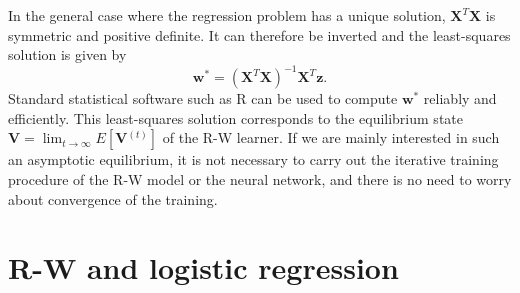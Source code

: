 \documentclass[conference]{IEEEtran}
\newcommand{\psup}[1]{\ensuremath{^{(#1)}}}
\newcommand{\psupt}{\psup{t}}
\begin{document}
In the general case where the regression problem has a unique solution, $\mathbf{X}^T \mathbf{X}$ is symmetric and positive definite.  It can therefore be inverted and the least-squares solution is given by
\begin{equation}
  \label{eq:lsr-solution}
  \mathbf{w}^* = (\mathbf{X}^T \mathbf{X})^{-1} \mathbf{X}^T \mathbf{z} .
\end{equation}
Standard statistical software such as R \cite{R2015} can be used to compute $\mathbf{w}^*$ reliably and efficiently.
This least-squares solution corresponds to the equilibrium state $\mathbf{V} = \lim_{t\to\infty} E[\mathbf{V}\psupt]$ of the R-W learner.  If we are mainly interested in such an asymptotic equilibrium,
it is not necessary to carry out the iterative training procedure of the R-W model or the neural network, and there is no need to worry about convergence of the training.


\section{R-W and logistic regression}
\label{sec:logistic}
\end{document}
